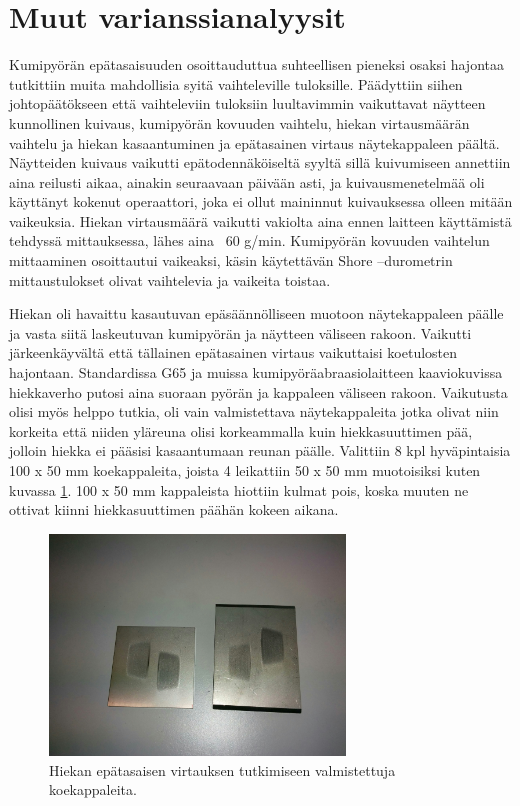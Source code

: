 \documentclass[12pt,a4paper,finnish]{tutthesis}
\begin{document}
\section{Muut varianssianalyysit}

Kumipyörän epätasaisuuden osoittauduttua suhteellisen pieneksi osaksi hajontaa tutkittiin muita mahdollisia syitä vaihteleville tuloksille.
Päädyttiin siihen johtopäätökseen että vaihteleviin tuloksiin luultavimmin vaikuttavat näytteen kunnollinen kuivaus, kumipyörän kovuuden vaihtelu, hiekan virtausmäärän vaihtelu ja hiekan kasaantuminen ja epätasainen virtaus näytekappaleen päältä. Näytteiden kuivaus vaikutti epätodennäköiseltä syyltä sillä kuivumiseen annettiin aina reilusti aikaa, ainakin seuraavaan päivään asti, ja kuivausmenetelmää oli käyttänyt kokenut operaattori, joka ei ollut maininnut kuivauksessa olleen mitään vaikeuksia. Hiekan virtausmäärä vaikutti vakiolta aina ennen laitteen käyttämistä tehdyssä mittauksessa, lähes aina ~60 g/min. Kumipyörän kovuuden vaihtelun mittaaminen osoittautui vaikeaksi, käsin käytettävän Shore –durometrin mittaustulokset olivat vaihtelevia ja vaikeita toistaa.

Hiekan oli havaittu kasautuvan epäsäännölliseen muotoon näytekappaleen päälle ja vasta siitä laskeutuvan
kumipyörän ja näytteen väliseen rakoon. Vaikutti järkeenkäyvältä että tällainen epätasainen virtaus vaikuttaisi koetulosten hajontaan. Standardissa G65 \parencite{Standard2010}
ja muissa kumipyöräabraasiolaitteen kaaviokuvissa hiekkaverho putosi aina suoraan pyörän ja kappaleen väliseen rakoon. Vaikutusta olisi myös helppo tutkia, oli vain valmistettava näytekappaleita jotka olivat niin korkeita että niiden yläreuna olisi korkeammalla kuin hiekkasuuttimen pää, jolloin hiekka ei pääsisi kasaantumaan reunan päälle.
Valittiin 8 kpl hyväpintaisia 100 x 50 mm koekappaleita, joista 4 leikattiin 50 x 50 mm muotoisiksi
kuten kuvassa \ref{fig:kappaleet}.
100 x 50 mm kappaleista hiottiin kulmat pois, koska muuten ne ottivat kiinni hiekkasuuttimen päähän kokeen aikana.

\begin{figure}
  \begin{center}
    \includegraphics[width=0.7\textwidth]{kappaleet}
  \end{center}
  \caption[Virtauskokeen koekappaleita]{Hiekan epätasaisen virtauksen tutkimiseen valmistettuja koekappaleita.}
  \label{fig:kappaleet}
\end{figure}
\end{document}
